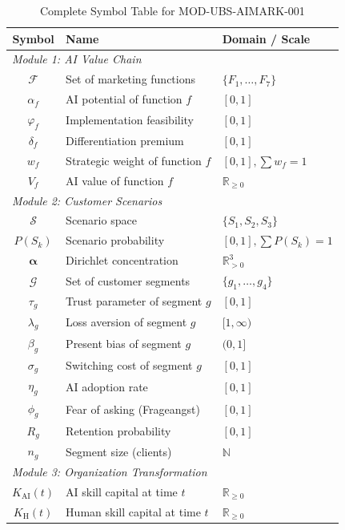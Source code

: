 \begin{table}[htbp]
\centering
\caption{Complete Symbol Table for MOD-UBS-AIMARK-001}
\label{tab:aim-symbols}
\renewcommand{\arraystretch}{1.3}
\begin{tabular}{@{}cll@{}}
\toprule
\textbf{Symbol} & \textbf{Name} & \textbf{Domain / Scale} \\
\midrule
\multicolumn{3}{l}{\textit{Module 1: AI Value Chain}} \\
$\mathcal{F}$ & Set of marketing functions & $\{F_1, \ldots, F_7\}$ \\
$\alpha_f$ & AI potential of function $f$ & $[0,1]$ \\
$\varphi_f$ & Implementation feasibility & $[0,1]$ \\
$\delta_f$ & Differentiation premium & $[0,1]$ \\
$w_f$ & Strategic weight of function $f$ & $[0,1], \sum w_f = 1$ \\
$V_f$ & AI value of function $f$ & $\mathbb{R}_{\geq 0}$ \\
\midrule
\multicolumn{3}{l}{\textit{Module 2: Customer Scenarios}} \\
$\mathcal{S}$ & Scenario space & $\{S_1, S_2, S_3\}$ \\
$P(S_k)$ & Scenario probability & $[0,1], \sum P(S_k) = 1$ \\
$\boldsymbol{\alpha}$ & Dirichlet concentration & $\mathbb{R}_{>0}^3$ \\
$\mathcal{G}$ & Set of customer segments & $\{g_1, \ldots, g_4\}$ \\
$\tau_g$ & Trust parameter of segment $g$ & $[0,1]$ \\
$\lambda_g$ & Loss aversion of segment $g$ & $[1, \infty)$ \\
$\beta_g$ & Present bias of segment $g$ & $(0,1]$ \\
$\sigma_g$ & Switching cost of segment $g$ & $[0,1]$ \\
$\eta_g$ & AI adoption rate & $[0,1]$ \\
$\phi_g$ & Fear of asking (Frageangst) & $[0,1]$ \\
$R_g$ & Retention probability & $[0,1]$ \\
$n_g$ & Segment size (clients) & $\mathbb{N}$ \\
\midrule
\multicolumn{3}{l}{\textit{Module 3: Organization Transformation}} \\
$K_{\text{AI}}(t)$ & AI skill capital at time $t$ & $\mathbb{R}_{\geq 0}$ \\
$K_{\text{H}}(t)$ & Human skill capital at time $t$ & $\mathbb{R}_{\geq 0}$ \\

\end{tabular}
\end{table}
